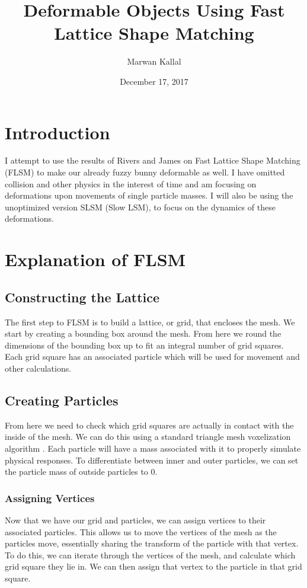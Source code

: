\documentclass[12pt,a4paper]{amsart}
\begin{document}
	\title{Deformable Objects Using Fast Lattice Shape Matching}
	\author{Marwan Kallal}
	\date{December 17, 2017}
	\maketitle
	
	\section{Introduction}
	I attempt to use the results of Rivers and James \cite{rivers} on Fast Lattice Shape Matching (FLSM) to make our already fuzzy bunny deformable as well. I have omitted collision and other physics in the interest of time and am focusing on  deformations upon movements of single particle masses. I will also be using the unoptimized version SLSM (Slow LSM), to focus on the dynamics of these deformations.
	
	\section{Explanation of FLSM}
	\subsection{Constructing the Lattice}
	The first step to FLSM is to build a lattice, or grid, that encloses the mesh. We start by creating a bounding box around the mesh. From here we round the dimensions of the bounding box up to fit an integral number of grid squares. Each grid square has an associated particle which will be used for movement and other calculations.  
	
	\subsection{Creating Particles}
	From here we need to check which grid squares are actually in contact with the inside of the mesh. We can do this using a standard triangle mesh voxelization algorithm \cite{rosen}. Each particle will have a mass associated with it to properly simulate physical responses. To differentiate between inner and outer particles, we can set the particle mass of outside particles to 0.
	
	\subsubsection{Assigning Vertices}
	Now that we have our grid and particles, we can assign vertices to their associated particles. This allows us to move the vertices of the mesh as the particles move, essentially sharing the transform of the particle with that vertex. To do this, we can iterate through the vertices of the mesh, and calculate which grid square they lie in. We can then assign that vertex to the particle in that grid square.
	
\end{document}
